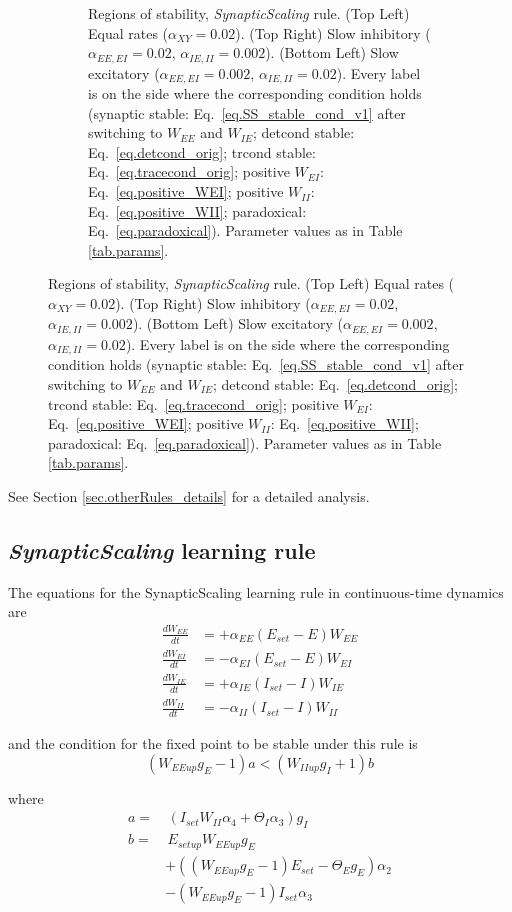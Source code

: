 \documentclass[twocolumn]{article}
\newcommand{\EE}{\mathit{EE}}
\newcommand{\EI}{\mathit{EI}}
\newcommand{\IE}{\mathit{IE}}
\newcommand{\II}{\mathit{II}}
\newcommand{\XY}{\mathit{XY}}
\newcommand{\set}{\mathit{set}}
\newcommand{\up}{\mathit{up}}
\begin{document}
\begin{figure}[!ht]
{\begin{figure}[H]
\caption{Regions of stability, {\em SynapticScaling} rule. (Top Left) Equal rates ($\alpha_{\XY}=0.02$). (Top Right) Slow inhibitory ($\alpha_{\EE,\EI}=0.02$, $\alpha_{\IE,\II}=0.002$). (Bottom Left) Slow excitatory ($\alpha_{\EE,\EI}=0.002$, $\alpha_{\IE,\II}=0.02$). Every label is on the side where the  corresponding  condition  holds (synaptic stable: Eq.\ \ref{eq.SS_stable_cond_v1} after switching to $W_{\EE}$ and $W_{\IE}$; detcond stable: Eq.\ \ref{eq.detcond_orig}; trcond stable: Eq.\ \ref{eq.tracecond_orig}; positive $W_{\EI}$: Eq.\ \ref{eq.positive_WEI}; positive $W_{\II}$: Eq.\ \ref{eq.positive_WII}; paradoxical: Eq.\ \ref{eq.paradoxical}). Parameter values as in Table \ref{tab.params}.}
\label{fig.SS_stability}
\end{figure}}
\end{figure}




See Section \ref{sec.otherRules_details} for a detailed analysis.



\subsection{{\em SynapticScaling} learning rule}


The equations for the SynapticScaling learning rule in continuous-time dynamics are
\begin{equation}
\begin{aligned}
\frac{dW_{\EE}}{dt} & = +\alpha_{\EE} (E_{\set} - E) W_{\EE} \\
\frac{dW_{\EI}}{dt} & = -\alpha_{\EI} (E_{\set} - E) W_{\EI} \\
\frac{dW_{\IE}}{dt} & = +\alpha_{\IE} (I_{\set} - I) W_{\IE} \\
\frac{dW_{\II}}{dt} & = -\alpha_{\II} (I_{\set} - I) W_{\II}
\end{aligned}
\label{eq.SS_summary}
\end{equation}

\noindent and the condition for the fixed point to be stable under this rule is
\begin{equation}
(W_{\EE\up}g_E - 1)a < (W_{\II\up}g_I + 1)b
\label{eq.SS_stable_cond_v1}
\end{equation}

\noindent where
\begin{displaymath}
\begin{aligned}
a = & \, (I_{\set} W_{\II} \alpha_4 + \Theta_I \alpha_3)g_I \\
b = & \, E_{\set\up} W_{\EE\up}g_E \\
& + ((W_{\EE\up} g_E - 1) E_{\set} - \Theta_E g_E)\alpha_2 \\
& - (W_{\EE\up} g_E - 1) I_{\set} \alpha_3
\end{aligned}
\end{displaymath}
\end{document}
